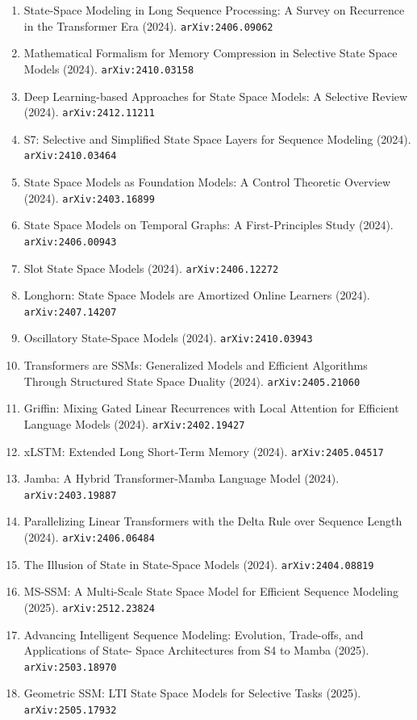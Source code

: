 \documentclass[11pt]{article}
\begin{document}
\begin{enumerate}
  \item State-Space Modeling in Long Sequence Processing: A Survey on Recurrence in the Transformer Era (2024). \texttt{arXiv:2406.09062}
  \item Mathematical Formalism for Memory Compression in Selective State Space
  Models (2024). \texttt{arXiv:2410.03158}
  \item Deep Learning-based Approaches for State Space Models: A Selective
  Review (2024). \texttt{arXiv:2412.11211}
  \item S7: Selective and Simplified State Space Layers for Sequence Modeling (2024). \texttt{arXiv:2410.03464}
  \item State Space Models as Foundation Models: A Control Theoretic Overview (2024). \texttt{arXiv:2403.16899}
  \item State Space Models on Temporal Graphs: A First-Principles Study (2024). \texttt{arXiv:2406.00943}
  \item Slot State Space Models (2024). \texttt{arXiv:2406.12272}
  \item Longhorn: State Space Models are Amortized Online Learners (2024). \texttt{arXiv:2407.14207}
  \item Oscillatory State-Space Models (2024). \texttt{arXiv:2410.03943}
  \item Transformers are SSMs: Generalized Models and Efficient Algorithms
  Through Structured State Space Duality (2024). \texttt{arXiv:2405.21060}
  \item Griffin: Mixing Gated Linear Recurrences with Local Attention for
  Efficient Language Models (2024). \texttt{arXiv:2402.19427}
  \item xLSTM: Extended Long Short-Term Memory (2024). \texttt{arXiv:2405.04517}
  \item Jamba: A Hybrid Transformer-Mamba Language Model (2024). \texttt{arXiv:2403.19887}
  \item Parallelizing Linear Transformers with the Delta Rule over Sequence
  Length (2024). \texttt{arXiv:2406.06484}
  \item The Illusion of State in State-Space Models (2024). \texttt{arXiv:2404.08819}
  \item MS-SSM: A Multi-Scale State Space Model for Efficient Sequence Modeling (2025). \texttt{arXiv:2512.23824}
  \item Advancing Intelligent Sequence Modeling: Evolution, Trade-offs, and Applications of State- Space Architectures from S4 to Mamba (2025). \texttt{arXiv:2503.18970}
  \item Geometric SSM: LTI State Space Models for Selective Tasks (2025). \texttt{arXiv:2505.17932}

\end{enumerate}
\end{document}
